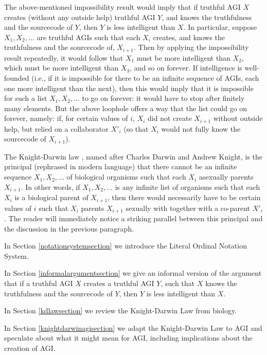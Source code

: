 \documentclass[runningheads]{llncs}
\begin{document}
The above-mentioned impossibility result would imply that if truthful
AGI $X$ creates (without any outside
help) truthful AGI $Y$, and knows the truthfulness and the sourcecode of $Y$,
then $Y$ is less intelligent than $X$. In particular, suppose $X_1,X_2,\ldots$
are truthful AGIs such that each $X_i$ creates, and knows the truthfulness and
the sourcecode of, $X_{i+1}$. Then by applying the impossibility result repeatedly,
it would follow that $X_1$ must be more intelligent than $X_2$, which must be more
intelligent than $X_3$, and so on forever. If intelligence is well-founded (i.e.,
if it is impossible for there to be an infinite sequence of AGIs, each one more
intelligent than the next), then this would imply that it is impossible for such
a list $X_1,X_2,\ldots$ to go on forever: it would have to stop after finitely
many elements. But the above loophole offers a way that the list could go on
forever, namely: if, for certain values of $i$, $X_i$ did not create $X_{i+1}$
without outside help, but relied on a collaborator $X'_i$ (so that $X_i$ would
not fully know the sourcecode of $X_{i+1}$).

The Knight-Darwin law \cite{darwin1898knight}, named after Charles Darwin
and Andrew Knight, is the
principal (rephrased in modern language) that there cannot be an infinite
sequence $X_1,X_2,\ldots$ of biological organisms such that each $X_i$ asexually
parents $X_{i+1}$. In other words, if $X_1,X_2,\ldots$ is any infinite list of
organisms such that each $X_i$ is a biological parent of $X_{i+1}$, then there
would necessarily have to be certain values of $i$ such that
$X_i$ parents $X_{i+1}$ sexually with together with a co-parent $X'_{i}$.
The reader will immediately notice a striking parallel between
this principal and the discussion in the previous paragraph.

In Section \ref{notationsystemsection} we introduce the Literal Ordinal Notation
System.

In Section \ref{informalargumentsection} we give an informal version of the
argument that if a truthful AGI $X$ creates a truthful AGI $Y$, such that $X$
knows the truthfulness and the sourcecode of $Y$, then $Y$ is less intelligent
than $X$.

In Section \ref{kdlawsection} we review the Knight-Darwin Law from biology.

In Section \ref{knightdarwinagisection} we adapt the Knight-Darwin Law to AGI
and speculate about what it might mean for AGI, including implications about
the creation of AGI.
\end{document}
